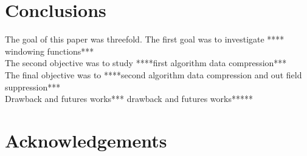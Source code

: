 \documentclass[useAMS,usenatbib]{mn2e}
\begin{document}
\section{Conclusions}
The goal of this paper was threefold. The first goal was to investigate **** windowing functions***\\
The second objective  was to study ****first algorithm data compression***\\
The final objective was to ****second algorithm data compression and out field suppression*** \\
Drawback and futures works*** drawback and futures works*****
\section*{Acknowledgements}


\appendix
\end{document}
